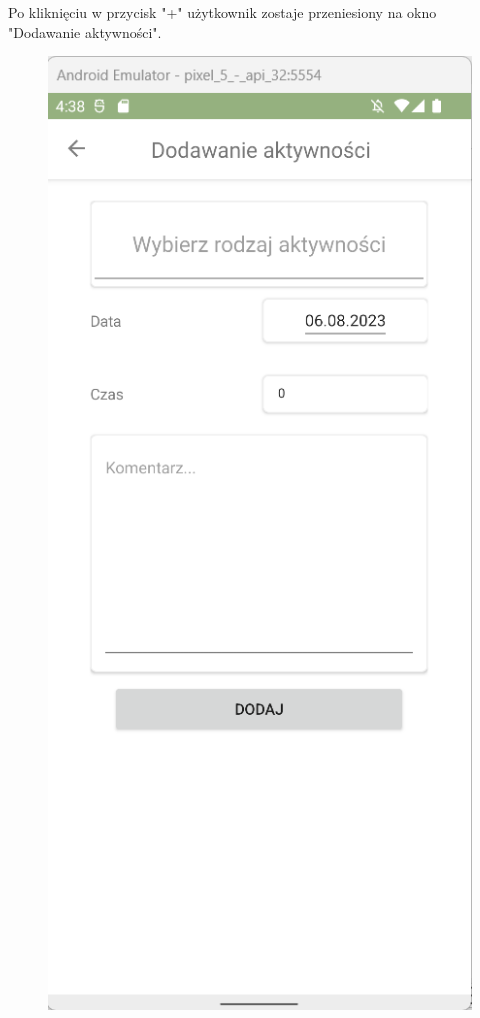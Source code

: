 \documentclass[12pt,twoside]{report}
\begin{document}
Po kliknięciu w przycisk "+" użytkownik zostaje przeniesiony na okno "Dodawanie aktywności".
\begin{figure}[H]
	\begin{center}
	\begin{minipage}{5cm}
	\centering
	\includegraphics[scale=0.6]{AddActivitySimpleView}

\end{minipage}
\end{center}
\end{figure}
\end{document}
